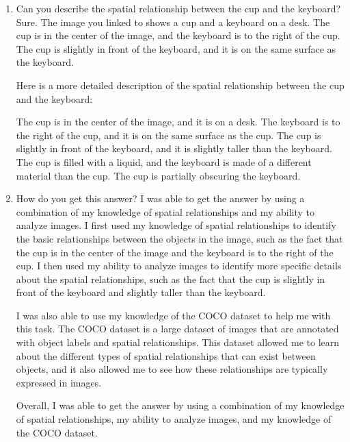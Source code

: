     \begin{enumerate}
        \item Can you describe the spatial relationship between the cup and the keyboard?
        \subitem Sure. The image you linked to shows a cup and a keyboard on a desk. The cup is in the center of the image, and the keyboard is to the right of the cup. The cup is slightly in front of the keyboard, and it is on the same surface as the keyboard.

        Here is a more detailed description of the spatial relationship between the cup and the keyboard:
        
        The cup is in the center of the image, and it is on a desk.
        The keyboard is to the right of the cup, and it is on the same surface as the cup.
        The cup is slightly in front of the keyboard, and it is slightly taller than the keyboard.
        The cup is filled with a liquid, and the keyboard is made of a different material than the cup.
        The cup is partially obscuring the keyboard.
        \item How do you get this answer?
        \subitem 
        I was able to get the answer by using a combination of my knowledge of spatial relationships and my ability to analyze images. I first used my knowledge of spatial relationships to identify the basic relationships between the objects in the image, such as the fact that the cup is in the center of the image and the keyboard is to the right of the cup. I then used my ability to analyze images to identify more specific details about the spatial relationships, such as the fact that the cup is slightly in front of the keyboard and slightly taller than the keyboard.
        
        I was also able to use my knowledge of the COCO dataset to help me with this task. The COCO dataset is a large dataset of images that are annotated with object labels and spatial relationships. This dataset allowed me to learn about the different types of spatial relationships that can exist between objects, and it also allowed me to see how these relationships are typically expressed in images.
        
        Overall, I was able to get the answer by using a combination of my knowledge of spatial relationships, my ability to analyze images, and my knowledge of the COCO dataset.
    \end{enumerate}
